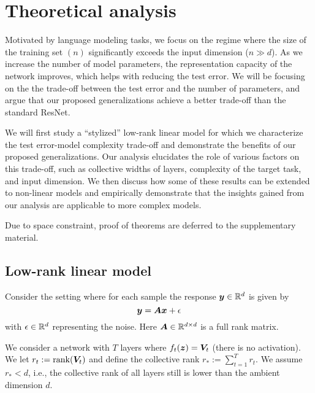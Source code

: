 \section{Theoretical analysis}
\label{sec:theory}


Motivated by language modeling tasks, we focus on the regime where the size of the training set $(n)$ significantly exceeds the input dimension ($n\gg d$). As we increase the number of model parameters, the representation capacity of the network improves, which helps with reducing the test error. We will be focusing on the  the trade-off between the test error and the number of parameters, and argue that our proposed generalizations  achieve a better trade-off than the standard ResNet. 

We will first study a ``stylized'' low-rank linear model for which we characterize the test error-model complexity trade-off and demonstrate the benefits of our proposed generalizations. Our analysis elucidates the role of various factors on this trade-off, such as collective widths of layers, complexity of the target task, and input dimension. We then discuss how some of these results can be extended to non-linear models and empirically demonstrate that the insights gained from our analysis are applicable to more complex models.

Due to space constraint, proof of theorems are deferred to the supplementary material.

\subsection{Low-rank linear model}
Consider the setting where for each sample the response $\bm{y}\in\mathbb{R}^d$ is given by
\[
\bm{y} = {\bm{A}} \bm{x}+ \epsilon
\]
with $\epsilon\in\mathbb{R}^d$ representing the noise.  Here ${\bm{A}}\in\mathbb{R}^{d\times d}$ is a full rank matrix.

We consider a network with $T$ layers where $f_t({\bm{z}}) = {\bm{V}}_t$ (there is no activation). We let $r_t:=\operatorname{rank}({\bm{V}}_t)$ and define the collective rank $r_*:=\sum_{t=1}^T r_t$. We assume $r_*<d$, i.e., the collective rank of all layers still is lower than the ambient dimension $d$.  


